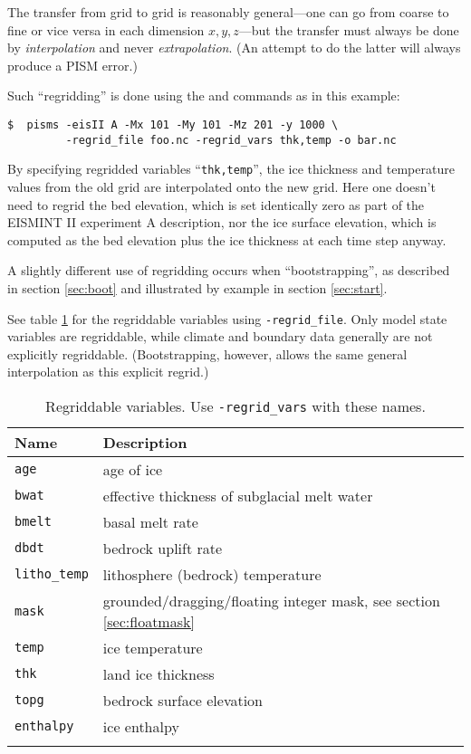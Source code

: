 The transfer from grid to grid is reasonably general---one can go from coarse to fine or vice versa in each dimension $x,y,z$---but the transfer must always be done by \emph{interpolation} and never \emph{extrapolation}.  (An attempt to do the latter will always produce a PISM error.)

Such ``regridding'' is done using the  and
 commands as in this example: 

\begin{verbatim}
$  pisms -eisII A -Mx 101 -My 101 -Mz 201 -y 1000 \
         -regrid_file foo.nc -regrid_vars thk,temp -o bar.nc
\end{verbatim}
\noindent By specifying regridded variables ``\texttt{thk,temp}'', the ice thickness and temperature values from the old grid are interpolated onto the new grid.  Here one doesn't need to regrid the bed elevation, which is set identically zero as part of the EISMINT II experiment A description, nor the ice surface elevation, which is computed as the bed elevation plus the ice thickness at each time step anyway.

A slightly different use of regridding occurs when ``bootstrapping'', as described in section \ref{sec:boot} and illustrated by example in section \ref{sec:start}.

See table \ref{tab:regridvar} for the regriddable variables using
\texttt{-regrid_file}.  Only model state variables are regriddable, while climate and boundary data generally are not explicitly regriddable.  (Bootstrapping, however, allows the same general interpolation as this explicit regrid.)

\begin{table}[ht]
  \centering
  \begin{tabular}{ll}\toprule
    \textbf{Name} & \textbf{Description}\\ \midrule
    \texttt{age} & age of ice\\
    \texttt{bwat} & effective thickness of subglacial melt water \\
    \texttt{bmelt} & basal melt rate \\
    \texttt{dbdt} & bedrock uplift rate \\
    \texttt{litho_temp} & lithosphere (bedrock) temperature \\
    \texttt{mask} & grounded/dragging/floating integer mask, see section \ref{sec:floatmask} \\
    \texttt{temp} & ice temperature \\
    \texttt{thk} & land ice thickness \\
    \texttt{topg} & bedrock surface elevation \\
    \texttt{enthalpy} & ice enthalpy\\
    \bottomrule
    \normalsize
  \end{tabular}
\caption{Regriddable variables.  Use \texttt{-regrid_vars} with these names.}
\label{tab:regridvar}
\end{table}

